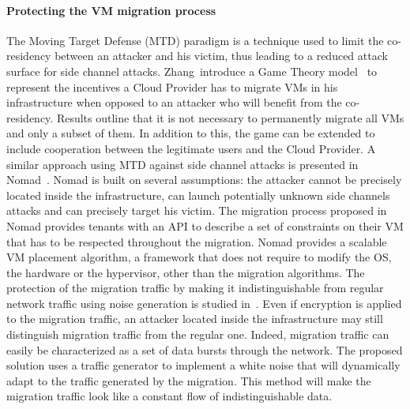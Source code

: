 \paragraph{Protecting the VM migration process}
The Moving Target Defense (MTD) paradigm is a technique used to limit the co-residency between an attacker and his victim, thus leading to a reduced attack surface for side channel attacks.
Zhang~\etal introduce a Game Theory model~\cite{incentivemtd-Zhang2012} to represent the incentives a Cloud Provider has to migrate VMs in his infrastructure when opposed to an attacker who will benefit from the co-residency. Results outline that it is not necessary to permanently migrate all VMs and only a subset of them. In addition to this, the game can be extended to include cooperation between the legitimate users and the Cloud Provider.
A similar approach using MTD against side channel attacks is presented in Nomad~\cite{nomad-Moon2015b}. Nomad is built on several assumptions: the attacker cannot be precisely located inside the infrastructure, can launch potentially unknown side channels attacks and can precisely target his victim. 
The migration process proposed in Nomad provides tenants with an API to describe a set of constraints on their VM that has to be respected throughout the migration.
Nomad provides a scalable VM placement algorithm, a framework that does not require to modify the OS, the hardware or the hypervisor, other than the migration algorithms.
The protection of the migration traffic by making it indistinguishable from regular network traffic using noise generation is studied in~\cite{stealth-Achleitner2017a}. Even if encryption is applied to the migration traffic, an attacker located inside the infrastructure may still distinguish migration traffic from the regular one. Indeed, migration traffic can easily be characterized as a set of data bursts through the network. The proposed solution uses a traffic generator to implement a white noise that will dynamically adapt to the traffic generated by the migration. This method will make the migration traffic look like a constant flow of indistinguishable data.

